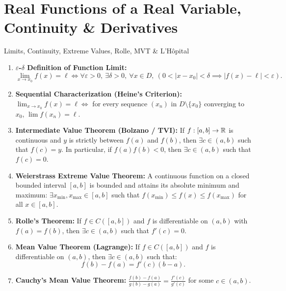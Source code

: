 \chapter{Real Functions of a Real Variable, Continuity \& Derivatives}
\label{chap:exo_ch05}

\begin{quicksummary}{Limits, Continuity, Extreme Values, Rolle, MVT \& L'Hôpital}
\begin{enumerate}[leftmargin=1.4em,itemsep=3pt]
  \item \textbf{$\varepsilon$-$\delta$ Definition of Function Limit:}
  \[
  \lim_{x \to x_0} f(x) = \ell \iff \forall \varepsilon > 0,\ \exists \delta > 0,\ \forall x \in D,\ (0 < |x - x_0| < \delta \implies |f(x) - \ell| < \varepsilon).
  \]
  \item \textbf{Sequential Characterization (Heine's Criterion):}
  $\lim_{x \to x_0} f(x) = \ell \iff$ for every sequence $(x_n)$ in $D \setminus \{x_0\}$ converging to $x_0$, $\lim f(x_n) = \ell$.
  \item \textbf{Intermediate Value Theorem (Bolzano / TVI):}
  If $f: [a, b] \to \mathbb{R}$ is continuous and $y$ is strictly between $f(a)$ and $f(b)$, then $\exists c \in (a, b)$ such that $f(c) = y$.
  In particular, if $f(a) f(b) < 0$, then $\exists c \in (a, b)$ such that $f(c) = 0$.
  \item \textbf{Weierstrass Extreme Value Theorem:}
  A continuous function on a closed bounded interval $[a, b]$ is bounded and attains its absolute minimum and maximum:
  $\exists x_{\min}, x_{\max} \in [a, b]$ such that $f(x_{\min}) \le f(x) \le f(x_{\max})$ for all $x \in [a, b]$.
  \item \textbf{Rolle's Theorem:}
  If $f \in C([a, b])$ and $f$ is differentiable on $(a, b)$ with $f(a) = f(b)$, then $\exists c \in (a, b)$ such that $f'(c) = 0$.
  \item \textbf{Mean Value Theorem (Lagrange):}
  If $f \in C([a, b])$ and $f$ is differentiable on $(a, b)$, then $\exists c \in (a, b)$ such that:
  \[
  f(b) - f(a) = f'(c)(b - a).
  \]
  \item \textbf{Cauchy's Mean Value Theorem:}
  $\frac{f(b) - f(a)}{g(b) - g(a)} = \frac{f'(c)}{g'(c)}$ for some $c \in (a, b)$.
\end{enumerate}
\end{quicksummary}

\vspace{10pt}

